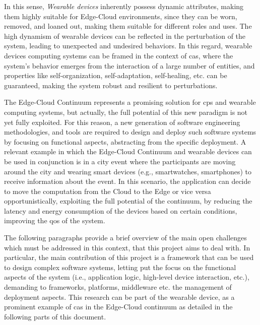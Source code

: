 \documentclass[12pt,a4paper]{article}
\begin{document}
In this sense,
\emph{Wearable devices} inherently possess dynamic attributes, making them highly suitable for Edge-Cloud environments,
since they can be worn,
removed, and loaned out,
making them suitable for different roles and uses.
%
The high dynamism of wearable devices can be reflected in the perturbation of the system,
leading to unexpected and undesired behaviors.
%
In this regard,
wearable devices computing systems can be framed in the context of \ac{cas},
where the system's behavior emerges from the interaction of a large number of entities,
and properties like self-organization, self-adaptation, self-healing, etc. can be guaranteed,
making the system robust and resilient to perturbations.

The Edge-Cloud Continuum represents a promising solution for \ac{cps} and wearable computing systems,
but actually,
the full potential of this new paradigm is not yet fully exploited.
%
For this reason,
a new generation of software engineering methodologies,
and tools are required to design and deploy such software systems by focusing on functional aspects,
abstracting from the specific deployment.
%
A relevant example in which the Edge-Cloud Continuum and wearable devices can be used in conjunction is
in a city event where the participants are moving around the city and wearing smart devices (e.g., smartwatches, smartphones) to receive information about the event.
%
In this scenario,
the application can decide to move the computation from the Cloud to the Edge or vice versa opportunistically,
exploiting the full potential of the continuum,
by reducing the latency and energy consumption of the devices based on certain conditions,
improving the \ac{qos} of the system.

The following paragraphs provide a brief overview of the main open challenges which must be addressed in this context,
that this project aims to deal with.
%
In particular,
the main contribution of this project is a framework that can be used to design complex software systems,
letting put the focus on the functional aspects of the system (i.e., application logic, high-level device interaction, etc.),
demanding to frameworks, platforms, middleware etc. the management of deployment aspects.
This research can be part of the wearable device,
as a prominent example of \ac{cas} in the Edge-Cloud continuum as detailed in the following parts of this document.
\end{document}
